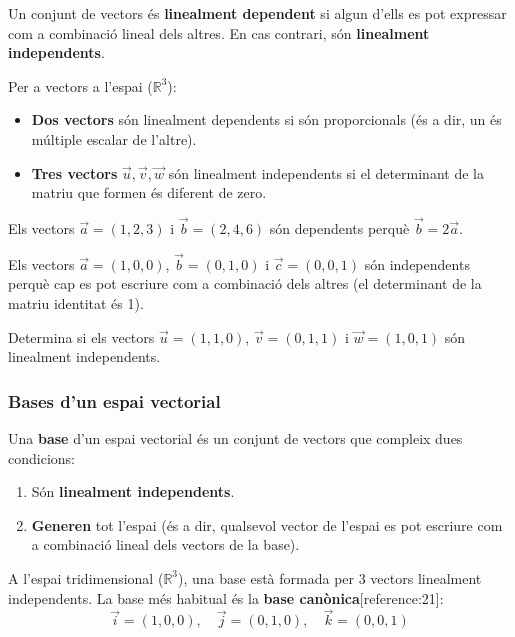 \documentclass[12pt]{article}
\begin{document}
\begin{concept}
Un conjunt de vectors és \textbf{linealment dependent} si algun d'ells es pot expressar com a combinació lineal dels altres. En cas contrari, són \textbf{linealment independents}.

Per a vectors a l'espai ($\mathbb{R}^3$):
\begin{itemize}
    \item \textbf{Dos vectors} són linealment dependents si són proporcionals (és a dir, un és múltiple escalar de l'altre).
    \item \textbf{Tres vectors} $\vec{u}, \vec{v}, \vec{w}$ són linealment independents si el determinant de la matriu que formen és diferent de zero.
\end{itemize}
\end{concept}

\begin{exemple}
Els vectors $\vec{a} = (1, 2, 3)$ i $\vec{b} = (2, 4, 6)$ són dependents perquè $\vec{b} = 2\vec{a}$.

Els vectors $\vec{a} = (1, 0, 0)$, $\vec{b} = (0, 1, 0)$ i $\vec{c} = (0, 0, 1)$ són independents perquè cap es pot escriure com a combinació dels altres (el determinant de la matriu identitat és 1).
\end{exemple}

\begin{exercici}
Determina si els vectors $\vec{u} = (1, 1, 0)$, $\vec{v} = (0, 1, 1)$ i $\vec{w} = (1, 0, 1)$ són linealment independents.
\end{exercici}

\subsubsection{Bases d'un espai vectorial}

\begin{concept}
Una \textbf{base} d'un espai vectorial és un conjunt de vectors que compleix dues condicions:
\begin{enumerate}
    \item Són \textbf{linealment independents}.
    \item \textbf{Generen} tot l'espai (és a dir, qualsevol vector de l'espai es pot escriure com a combinació lineal dels vectors de la base).
\end{enumerate}

A l'espai tridimensional ($\mathbb{R}^3$), una base està formada per 3 vectors linealment independents. La base més habitual és la \textbf{base canònica}[reference:21]:
\[
\vec{i} = (1, 0, 0), \quad \vec{j} = (0, 1, 0), \quad \vec{k} = (0, 0, 1)
\]
\end{concept}
\end{document}
